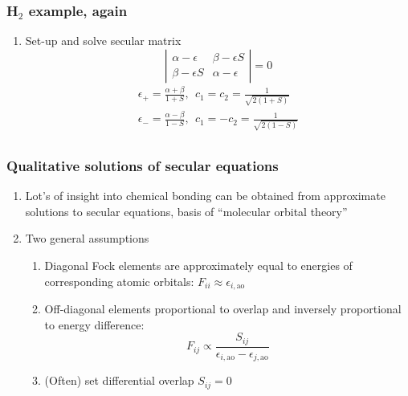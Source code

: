 \documentclass[11pt]{article}
\begin{document}
\subsubsection{H\(_2\) example, again}
\label{sec:orga608efb}
\begin{enumerate}
\item Set-up and solve secular matrix
\begin{displaymath}
 \left | \begin{array}{cc}
     \alpha-\epsilon & \beta-\epsilon S \\
     \beta - \epsilon S & \alpha-\epsilon
     \end{array} \right | = 0
\end{displaymath}
\begin{eqnarray*}
  \epsilon_+=\frac{\alpha+\beta}{1+S},\ \ c_1=c_2=\frac{1}{\sqrt{2(1+S)}} \\
  \epsilon_-=\frac{\alpha-\beta}{1-S},\ \ c_1=-c_2=\frac{1}{\sqrt{2(1-S)}} \\
\end{eqnarray*}
\end{enumerate}
\subsubsection{Qualitative solutions of secular equations}
\label{sec:org32675d6}
\begin{enumerate}
\item Lot's of insight into chemical bonding can be obtained from approximate solutions to secular equations, basis of ``molecular orbital theory''
\item Two general assumptions
\begin{enumerate}
\item Diagonal Fock elements are approximately equal to energies of corresponding atomic orbitals: \(F_{ii} \approx \epsilon_{i,\mathrm{ao}}\)
\item Off-diagonal elements proportional to overlap and inversely proportional to energy difference:
\begin{displaymath}
  F_{ij} \propto \frac{S_{ij}}{\epsilon_{i,\mathrm{ao}}-\epsilon_{j,\mathrm{ao}}}
\end{displaymath}
\item (Often) set differential overlap \(S_{ij}=0\)
\end{enumerate}
\end{enumerate}
\end{document}
